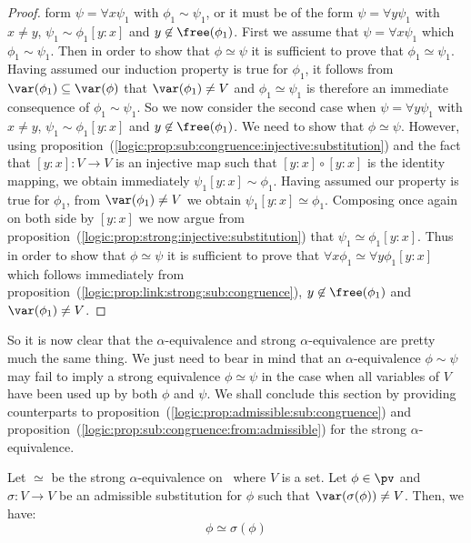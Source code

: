 \begin{proof}
form $\psi=\forall x\psi_{1}$ with $\phi_{1}\sim\psi_{1}$, or it
must be of the form $\psi=\forall y\psi_{1}$ with $x\neq y$,
$\psi_{1}\sim\phi_{1}[y\!:\!x]$ and $y\not\in\free(\phi_{1})$. First
we assume that $\psi=\forall x\psi_{1}$ which
$\phi_{1}\sim\psi_{1}$. Then in order to show that $\phi\simeq\psi$
it is sufficient to prove that $\phi_{1}\simeq\psi_{1}$. Having
assumed our induction property is true for $\phi_{1}$, it follows
from $\var(\phi_{1})\subseteq\var(\phi)$ that $\var(\phi_{1})\neq V$
and $\phi_{1}\simeq\psi_{1}$ is therefore an immediate consequence
of $\phi_{1}\sim\psi_{1}$. So we now consider the second case when
$\psi=\forall y\psi_{1}$ with $x\neq y$,
$\psi_{1}\sim\phi_{1}[y\!:\!x]$ and $y\not\in\free(\phi_{1})$. We
need to show that $\phi\simeq\psi$. However, using
proposition~(\ref{logic:prop:sub:congruence:injective:substitution})
and the fact that $[y\!:\!x]:V\to V$ is an injective map such that
$[y\!:\!x]\circ[y\!:\!x]$ is the identity mapping, we obtain
immediately $\psi_{1}[y\!:\!x]\sim\phi_{1}$. Having assumed our
property is true for $\phi_{1}$, from $\var(\phi_{1})\neq V$ we
obtain $\psi_{1}[y\!:\!x]\simeq\phi_{1}$. Composing once again on
both side by $[y\!:\!x]$ we now argue from
proposition~(\ref{logic:prop:strong:injective:substitution}) that
$\psi_{1}\simeq\phi_{1}[y\!:\!x]$. Thus in order to show that
$\phi\simeq\psi$ it is sufficient to prove that $\forall
x\phi_{1}\simeq\forall y\phi_{1}[y\!:\!x]$ which follows immediately
from proposition~(\ref{logic:prop:link:strong:sub:congruence}),
$y\not\in\free(\phi_{1})$ and $\var(\phi_{1})\neq V$.
\end{proof}

So it is now clear that the $\alpha$-equivalence and 
strong $\alpha$-equivalence are pretty much the same thing. We just need
to bear in mind that an $\alpha$-equivalence $\phi\sim\psi$ may fail to imply
a strong equivalence $\phi\simeq\psi$ in the case when all variables
of $V$ have been used up by both $\phi$ and $\psi$. We shall
conclude this section by providing counterparts to
proposition~(\ref{logic:prop:admissible:sub:congruence}) and
proposition~(\ref{logic:prop:sub:congruence:from:admissible}) for
the strong $\alpha$-equivalence.

\begin{prop}\label{logic:prop:admissible:strong}
Let $\simeq$ be the strong $\alpha$-equivalence on \pv\ where $V$
is a set. Let $\phi\in\pv$ and $\sigma:V\to V$ be an admissible
substitution for $\phi$ such that $\var(\sigma(\phi))\neq V$. Then,
we have:
    \[
    \phi\simeq\sigma(\phi)
    \]
\end{prop}

